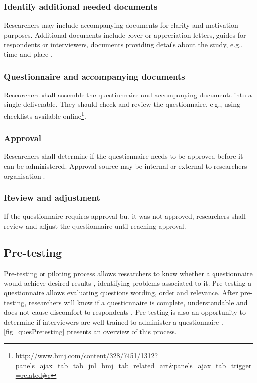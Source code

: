\subsubsection{Identify additional needed documents}
Researchers may include accompanying documents for clarity and motivation purposes. Additional documents include cover or appreciation letters, guides for respondents or interviewers, documents providing details about the study, e.g., time and place \cite{Diem,Crawford1997,Boynton2004b}.

\subsubsection{Questionnaire and accompanying documents}
Researchers shall assemble the questionnaire and accompanying documents into a single deliverable. They should check and review the questionnaire, e.g., using checklists available online\footnote{\url{http://www.bmj.com/content/328/7451/1312?panels_ajax_tab_tab=jnl_bmj_tab_related_art&panels_ajax_tab_trigger=related\#c}}.

\subsubsection{Approval}
Researchers shall determine if the questionnaire needs to be approved before it can be administered. Approval source may be internal or external to researchers organisation \cite{Diem}.

\subsubsection{Review and adjustment}
If the questionnaire requires approval but it was not approved, researchers shall review and adjust the questionnaire until reaching approval.

\subsection{Pre-testing}
\label{sec:ques_pretesting}
Pre-testing or piloting process allows researchers to know whether a questionnaire would achieve desired results \cite{Crawford1997}, identifying problems associated to it. Pre-testing a questionnaire allows evaluating questions wording, order and relevance. After pre-testing, researchers will know if a questionnaire is complete, understandable and does not cause discomfort to respondents \cite{Boynton2004}. Pre-testing is also an opportunity to determine if interviewers are well trained to administer a questionnaire \cite{Crawford1997}. \autoref{fig_quesPretesting} presents an overview of this process.


